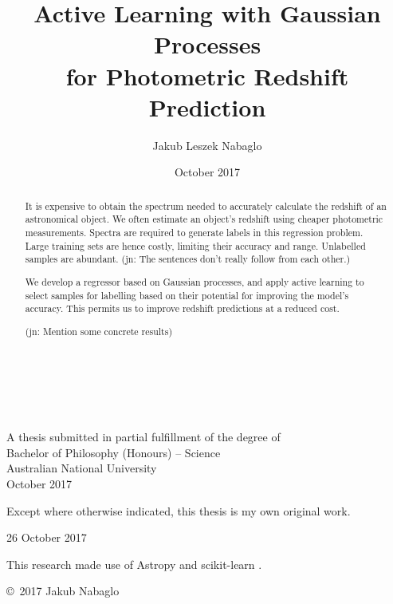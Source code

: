 \documentclass[11pt,twoside,openright]{report}
\title{Active Learning with Gaussian Processes\\for Photometric Redshift Prediction}
\author{Jakub Leszek Nabaglo}
\date{October 2017}
\newcommand\jn[1]{{\color{red}(jn: #1)}}
\begin{document}
\begin{titlepage}
  \enlargethispage{2cm}
  \begin{center}
    \makeatletter
    \hspace{0pt} \\[3cm]
    \huge\@title \\[.4cm]

    \LARGE\@author \\[8.5cm]
    \makeatother
    \Large A thesis submitted in partial fulfillment of the degree of \\
    \LARGE Bachelor of Philosophy (Honours) -- Science\\[3cm]

    \LARGE Australian National University \\[1cm]
    October 2017
  \end{center}
\end{titlepage}

\vspace*{5cm}
\begin{center}
  Except where otherwise indicated, this thesis is my own original
  work.
\end{center}

\vspace*{2cm}

\hspace{8cm}\makeatletter\@author\makeatother\par
\hspace{8cm}26 October 2017

\vspace*{12cm}

This research made use of Astropy \cite{Astropy} and scikit-learn \cite{Sklearn}.

\begin{center}
  \copyright\ 2017 Jakub Nabaglo
\end{center}
\noindent

\begin{abstract}
  It is expensive to obtain the spectrum needed to accurately calculate the redshift of an astronomical object. We often estimate an object's redshift using cheaper photometric measurements. Spectra are required to generate labels in this regression problem. Large training sets are hence costly, limiting their accuracy and range. Unlabelled samples are abundant. \jn{The sentences don't really follow from each other.}

  We develop a regressor based on Gaussian processes, and apply active learning to select samples for labelling based on their potential for improving the model's accuracy. This permits us to improve redshift predictions at a reduced cost.

  \jn{Mention some concrete results}
\end{abstract}
\end{document}
